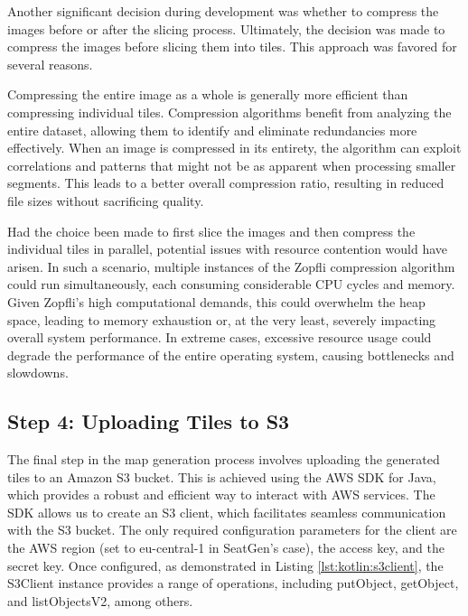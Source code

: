 Another significant decision during development was whether to compress the images before or after the slicing process. Ultimately, the decision was made to compress the images before slicing them into tiles. This approach was favored for several reasons.

Compressing the entire image as a whole is generally more efficient than compressing individual tiles. Compression algorithms benefit from analyzing the entire dataset, allowing them to identify and eliminate redundancies more effectively. When an image is compressed in its entirety, the algorithm can exploit correlations and patterns that might not be as apparent when processing smaller segments. This leads to a better overall compression ratio, resulting in reduced file sizes without sacrificing quality.

Had the choice been made to first slice the images and then compress the individual tiles in parallel, potential issues with resource contention would have arisen. In such a scenario, multiple instances of the Zopfli compression algorithm could run simultaneously, each consuming considerable CPU cycles and memory. Given Zopfli’s high computational demands, this could overwhelm the heap space, leading to memory exhaustion or, at the very least, severely impacting overall system performance. In extreme cases, excessive resource usage could degrade the performance of the entire operating system, causing bottlenecks and slowdowns.

\subsection{Step 4: Uploading Tiles to S3}

The final step in the map generation process involves uploading the generated tiles to an Amazon S3 bucket. This is achieved using the AWS SDK for Java, which provides a robust and efficient way to interact with AWS services. The SDK allows us to create an S3 client, which facilitates seamless communication with the S3 bucket. The only required configuration parameters for the client are the AWS region (set to eu-central-1 in SeatGen's case), the access key, and the secret key. Once configured, as demonstrated in Listing \ref{lst:kotlin:s3client}, the S3Client instance provides a range of operations, including putObject, getObject, and listObjectsV2, among others.

